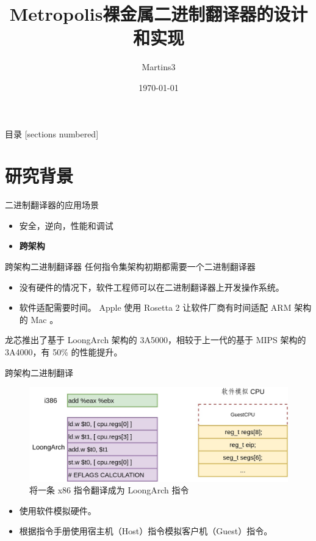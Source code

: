 \documentclass{beamer}
\title{Metropolis}
\title{裸金属二进制翻译器的设计和实现}
\date{\today}
\author{Martins3}
\institute{The Open Source Community}
\begin{document}
\maketitle

\begin{frame}{目录}
	[sections numbered]
	\tableofcontents[hideallsubsections]
\end{frame}

\section{研究背景}
\begin{frame}{二进制翻译器的应用场景}
	\begin{itemize}
		\item 安全，逆向，性能和调试
		\item \textbf{跨架构}
	\end{itemize}
\end{frame}

\begin{frame}{跨架构二进制翻译器}
	任何指令集架构初期都需要一个二进制翻译器
	\begin{itemize}
		\item 没有硬件的情况下，软件工程师可以在二进制翻译器上开发操作系统。
		\item 软件适配需要时间。 Apple 使用 Rosetta 2 让软件厂商有时间适配 ARM 架构的 Mac 。
	\end{itemize}

	龙芯推出了基于 LoongArch 架构的 3A5000，相较于上一代的基于 MIPS 架构的 3A4000，有 50\% 的性能提升。
\end{frame}

\begin{frame}{跨架构二进制翻译}
	\begin{figure}
		\includegraphics[width=0.8\linewidth]{../paper/images/basic-flow.jpg}
		\caption{将一条 x86 指令翻译成为 LoongArch 指令}
	\end{figure}
	\begin{itemize}
		\item 使用软件模拟硬件。
		\item 根据指令手册使用宿主机（Host）指令模拟客户机（Guest）指令。
	\end{itemize}
\end{frame}
\end{document}
